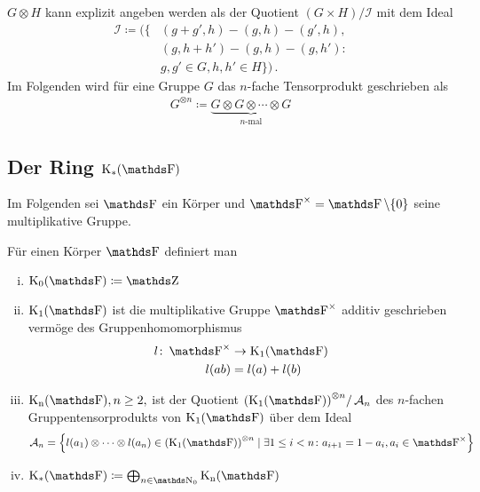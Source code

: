 \documentclass[ngerman,fontsize=11pt, paper=a4, parskip=half, titlepage=true, toc=bib]{scrartcl}
\begin{document}
\begin{Bem}[Gruppentensorprodukt]
  $G\otimes H$ kann explizit angeben werden als der Quotient
  $(G\times H) / \mathcal{I}$ mit dem Ideal 
  \begin{align*}
    \mathcal{I}\coloneqq \big(
    \big\{&(g+g',h)-(g,h)-(g',h), \\
          &(g,h+h')-(g,h)-(g,h') \colon\\
          &g,g'\in G, h,h'\in H \big\}
            \big)\,.
  \end{align*}
  Im Folgenden wird für eine Gruppe $G$ das $n$-fache Tensorprodukt
  geschrieben als
  \begin{gather*}
    G^{\otimes n}
    \coloneqq \underbrace{G\otimes G\otimes\dotsb\otimes G}_{n\text{-mal}}
  \end{gather*}
\end{Bem}

\subsection{Der Ring $\KF$}
Im Folgenden sei $\F$ ein Körper und $\Fx=\F\setminus \{0\}$ seine
multiplikative Gruppe.

\begin{Def}[$\KF$]\label{defkf}
  Für einen Körper $\F$ definiert man
  \begin{enumerate}[i)]
  \item $\K_0(\F)\coloneqq \Z$
  \item $\K_1(\F)$ ist die multiplikative Gruppe $\Fx$ additiv geschrieben
    vermöge des Gruppenhomomorphismus 
    \begin{align*}
      l\colon \Fx&\to \K_1(\F)\\
      l(ab)&=l(a)+l(b)
    \end{align*}
  \item $\KnF, n\geq 2,$ ist der Quotient 
    ${(\K_1(\F))}^{\otimes n}/\calA_n$
    des $n$-fachen Gruppentensorprodukts von $\K_1(\F)$ über dem Ideal 
    \begin{gather*}
      \calA_n=\left\{ l(a_1)\otimes\dotsb\otimes l(a_n)
        \in {(\K_1(\F))}^{\otimes n}
        \mid
        \exists 1\leq i < n \colon a_{i+1}=1-a_i, a_i\in\Fx \right\}
    \end{gather*}
  \item $\KF\coloneqq \bigoplus_{n\in\N_0}\KnF$
  \end{enumerate}
\end{Def}
\end{document}
